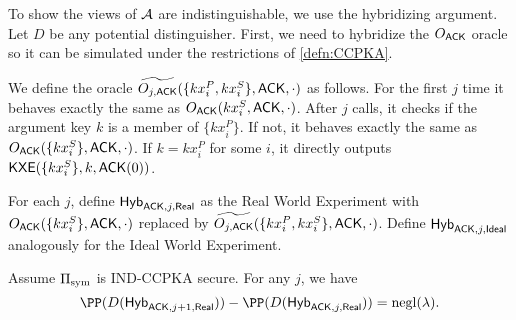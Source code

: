 To show the views of $\mathcal{A}$ are indistinguishable, we use the hybridizing argument. Let $D$ be any potential distinguisher. First, we need to hybridize the $O_{\mathsf{ACK}}$ oracle so it can be simulated under the restrictions of \cref{defn:CCPKA}. 
\begin{definition}
We define the oracle $\widetilde{O_{j, \mathsf{ACK}}}(\{kx_i^P, kx_i^S\}, \mathsf{ACK}, \cdot)$ as follows. For the first $j$ time it behaves exactly the same as $O_{\mathsf{ACK}}(kx_i^S, \mathsf{ACK}, \cdot)$. After $j$ calls, it checks if the argument key $k$ is a member of $\{kx_i^P\}$. If not, it behaves exactly the same as $O_{\mathsf{ACK}}(\{kx_i^S\}, \mathsf{ACK}, \cdot)$. If $k = kx_i^P$ for some $i$, it directly outputs $\mathsf{KXE}(\{kx_i^S\}, k, \mathsf{ACK}(0))$.

    For each $j$, define $\mathsf{Hyb}_{\mathsf{ACK}, j, \mathsf{Real}}$ as the Real World Experiment with $O_{\mathsf{ACK}}(\{kx_i^S\}, \mathsf{ACK}, \cdot)$ replaced by $\widetilde{O_{j, \mathsf{ACK}}}(\{kx_i^P, kx_i^S\}, \mathsf{ACK}, \cdot)$. Define $\mathsf{Hyb}_{\mathsf{ACK}, j, \mathsf{Ideal}}$ analogously for the Ideal World Experiment. 
\end{definition}
\begin{lemma}
    Assume $\Pi_{\text{sym}}$ is IND-CCPKA secure. For any $j$, we have 
    $$\PP(D(\Hyb_{\ACK, j + 1, \Real})) - \PP(D(\Hyb_{\ACK, j, \Real})) = \negl(\lambda).$$
\end{lemma}
